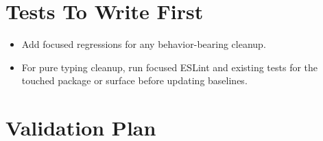 \section{Tests To Write First}\label{record-232-tests-to-write-first}

\begin{itemize}
\tightlist
\item
  Add focused regressions for any behavior-bearing cleanup.
\item
  For pure typing cleanup, run focused ESLint and existing tests for the touched package or surface before updating baselines.
\end{itemize}

\section{Validation Plan}\label{record-232-validation-plan}

